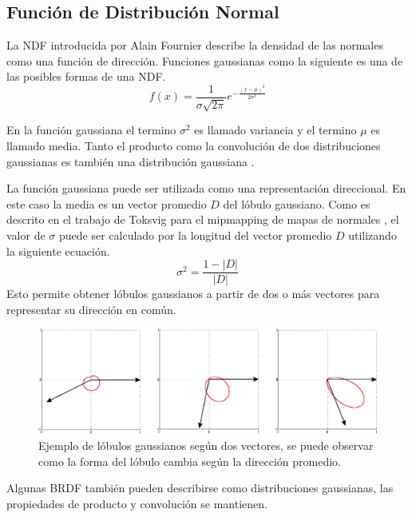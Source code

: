 \subsection{Función de Distribución Normal}
La \ac{NDF} introducida por Alain Fournier \cite{fournier1992d} describe la densidad de las normales como una función de dirección. Funciones gaussianas como la siguiente es una de las posibles formas de una \ac{NDF}.
\begin{equation}
    f(x) = \frac{1}{\sigma\sqrt{2\pi}}e^{-\frac{(x-\mu)^2}{2\sigma^2}}
    \label{eq:ndf_ex1}
\end{equation}

En la función gaussiana el termino $\sigma^2$ es llamado variancia y el termino $\mu$ es llamado media. Tanto el producto como la convolución de dos distribuciones gaussianas es también una distribución gaussiana \cite{tina-2003}.

La función gaussiana puede ser utilizada como una representación direccional. En este caso la media es un vector promedio $D$ del lóbulo gaussiano. Como es descrito en el trabajo de Toksvig para el mipmapping de mapas de normales \cite{Toksvig05}, el valor de $\sigma$ puede ser calculado por la longitud del vector promedio $D$ utilizando la siguiente ecuación.
\begin{equation}
    \sigma^2 = \frac{1-|D|}{|D|}
    \label{eq:gaussia_eq}
\end{equation}
Esto permite obtener lóbulos gaussianos a partir de dos o más vectores para representar su dirección en común.

\begin{figure}[H]
	\centering
	\includegraphics[width=0.85\linewidth]{media/lobes.eps}
	\caption{Ejemplo de lóbulos gaussianos según dos vectores, se puede observar como la forma del lóbulo cambia según la dirección promedio.}
	\label{fig:lobes_example}
\end{figure}

Algunas \ac{BRDF} también pueden describirse como distribuciones gaussianas, las propiedades de producto y convolución se mantienen.

